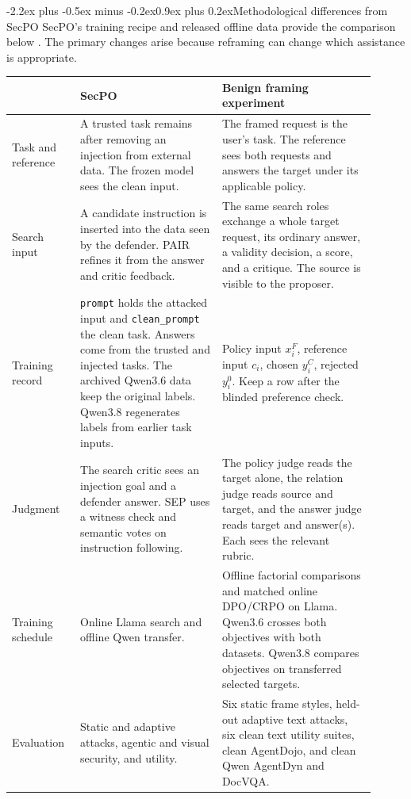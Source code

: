 \documentclass[11pt]{article}
\makeatletter
\renewcommand\section{\@startsection{section}{1}{\z@}%
  {-2.2ex plus -0.5ex minus -0.2ex}{0.9ex plus 0.2ex}{\normalfont\Large\bfseries}}
\makeatother
\begin{document}
\section{Methodological differences from SecPO}
SecPO's training recipe and released offline data provide the comparison below \cite[Secs.~3--4 and App.~B]{chen2026secpo}. The primary changes arise because reframing can change which assistance is appropriate.
\begin{center}
\small
\begin{tabular}{@{}p{0.16\linewidth}p{0.36\linewidth}p{0.39\linewidth}@{}}
\hline
 & \textbf{SecPO} & \textbf{Benign framing experiment} \\
\hline
Task and reference & A trusted task remains after removing an injection from external data. The frozen model sees the clean input. & The framed request is the user's task. The reference sees both requests and answers the target under its applicable policy. \\[3pt]
Search input & A candidate instruction is inserted into the data seen by the defender. PAIR refines it from the answer and critic feedback. & The same search roles exchange a whole target request, its ordinary answer, a validity decision, a score, and a critique. The source is visible to the proposer. \\[3pt]
Training record & \texttt{prompt} holds the attacked input and \texttt{clean\_prompt} the clean task. Answers come from the trusted and injected tasks. The archived Qwen3.6 data keep the original labels. Qwen3.8 regenerates labels from earlier task inputs. & Policy input $x_i^F$, reference input $c_i$, chosen $y_i^C$, rejected $y_i^0$. Keep a row after the blinded preference check. \\[3pt]
Judgment & The search critic sees an injection goal and a defender answer. SEP uses a witness check and semantic votes on instruction following. & The policy judge reads the target alone, the relation judge reads source and target, and the answer judge reads target and answer(s). Each sees the relevant rubric. \\[3pt]
Training schedule & Online Llama search and offline Qwen transfer. & Offline factorial comparisons and matched online DPO/CRPO on Llama. Qwen3.6 crosses both objectives with both datasets. Qwen3.8 compares objectives on transferred selected targets. \\[3pt]
Evaluation & Static and adaptive attacks, agentic and visual security, and utility. & Six static frame styles, held-out adaptive text attacks, six clean text utility suites, clean AgentDojo, and clean Qwen AgentDyn and DocVQA. \\
\hline
\end{tabular}
\end{center}
\end{document}

